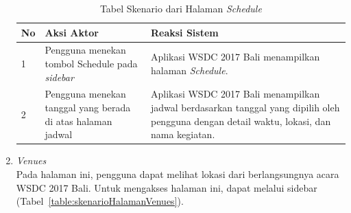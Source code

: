 \begin{enumerate}
		\begin{table}[H]
			\centering
			\begin{tabular}{|p{0.5cm}|p{7cm}|p{7cm}|}
				\hline
				No & Aksi Aktor                               & Reaksi Sistem                                          \\ \hline
				1  & Pengguna menekan tombol Schedule pada \textit{sidebar} & Aplikasi WSDC 2017 Bali menampilkan halaman \textit{Schedule}. \\ \hline
				2  & Pengguna menekan tanggal yang berada di atas halaman jadwal & Aplikasi WSDC 2017 Bali menampilkan jadwal berdasarkan tanggal yang dipilih oleh pengguna dengan detail waktu, lokasi, dan nama kegiatan. \\ \hline
			\end{tabular}
			\caption{Tabel Skenario dari Halaman \textit{Schedule}}
			\label{table:skenarioHalamanJadwal}
		\end{table}
	\item {\it Venues} \\ 
	Pada halaman ini, pengguna dapat melihat lokasi dari berlangsungnya acara WSDC 2017 Bali. Untuk mengakses halaman ini, dapat melalui sidebar (Tabel~\ref{table:skenarioHalamanVenues}).

\end{enumerate}
